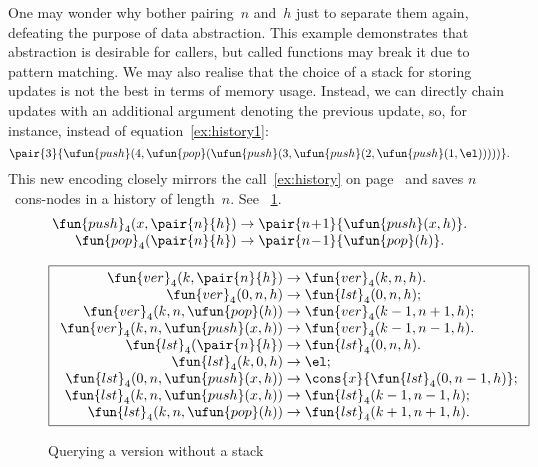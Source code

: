 One may wonder why bother pairing~\(n\) and~\(h\) just to separate
them again, defeating the purpose of data abstraction. This example
demonstrates that abstraction is desirable for callers, but called
functions may break it due to pattern matching. We may also realise
that the choice of a stack for storing updates is not the best in
terms of memory usage. Instead, we can directly chain updates with an
additional argument denoting the previous update, so, for instance,
instead of equation~\eqref{ex:history1}:
\begin{equation*}
\pair{3}{\ufun{push}(4, \ufun{pop}(\ufun{push}(3, \ufun{push}(2, \ufun{push}(1,\el)))))}.
\end{equation*}
This new encoding closely mirrors
the call~\eqref{ex:history} on page~\pageref{ex:history} and saves
\(n\)~cons\hyp{}nodes in a history of length~\(n\). See
\fig~\ref{fig:ver}.
\begin{equation*}
\begin{array}{@{}r@{\;}l@{\;}l@{}}
\fun{push}_4(x,\pair{n}{h}) & \rightarrow &
\pair{n\!+\!1}{\ufun{push}(x,h)}.\\
\fun{pop}_4(\pair{n}{h}) & \rightarrow &
\pair{n\!-\!1}{\ufun{pop}(h)}.
\end{array}
\end{equation*}
\begin{figure}[t]
\begin{equation*}
\boxed{%
\begin{array}{r@{\;}l@{\;}l}
\fun{ver}_4(k,\pair{n}{h}) & \rightarrow & \fun{ver}_4(k,n,h).\\
\fun{ver}_4(0,n,h) & \rightarrow & \fun{lst}_4(0,n,h);\\
\fun{ver}_4(k,n,\ufun{pop}(h))
                      & \rightarrow & \fun{ver}_4(k-1,n+1,h);\\
\fun{ver}_4(k,n,\ufun{push}(x,h))
                      & \rightarrow & \fun{ver}_4(k-1,n-1,h).\\
\fun{lst}_4(\pair{n}{h}) & \rightarrow & \fun{lst}_4(0,n,h).\\
\fun{lst}_4(k,0,h) & \rightarrow & \el;\\
\fun{lst}_4(0,n,\ufun{push}(x,h)) & \rightarrow
                      & \cons{x}{\fun{lst}_4(0,n-1,h)};\\
\fun{lst}_4(k,n,\ufun{push}(x,h)) & \rightarrow
                      & \fun{lst}_4(k-1,n-1,h);\\
\fun{lst}_4(k,n,\ufun{pop}(h)) & \rightarrow
                      & \fun{lst}_4(k+1,n+1,h).
\end{array}}
\end{equation*}
\caption{Querying a version without a stack}
\label{fig:ver}
\end{figure}

